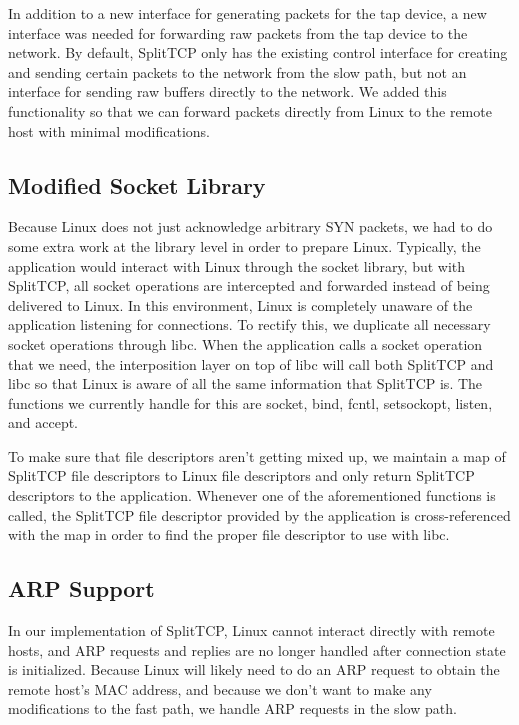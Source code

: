 In addition to a new interface for generating packets for the tap device, a new
interface was needed for forwarding raw packets from the tap device to the 
network. By default, SplitTCP only has the existing control interface for 
creating and sending certain packets to the network from the slow path, but 
not an interface for sending raw buffers directly to the network. We added this
functionality so that we can forward packets directly from Linux to the remote
host with minimal modifications.

\subsection{Modified Socket Library}

Because Linux does not just acknowledge arbitrary SYN packets, we had to do some
extra work at the library level in order to prepare Linux. Typically, the 
application would interact with Linux through the socket library, but with 
SplitTCP, all socket operations are intercepted and forwarded instead of being
delivered to Linux. In this environment, Linux is completely unaware of the 
application listening for connections. To rectify this, we duplicate all 
necessary socket operations through libc. When the application calls a socket 
operation that we need, the interposition layer on top of libc will call both 
SplitTCP and libc so that Linux is aware of all the same information that 
SplitTCP is. The functions we currently handle for this are socket, bind, 
fcntl, setsockopt, listen, and accept. 

To make sure that file descriptors aren't getting mixed up, we maintain a map
of SplitTCP file descriptors to Linux file descriptors and only return SplitTCP
descriptors to the application. Whenever one of the aforementioned functions is 
called, the SplitTCP file descriptor provided by the application is 
cross-referenced with the map in order to find the proper file descriptor to use
with libc. 

\subsection{ARP Support}

In our implementation of SplitTCP, Linux cannot interact directly with remote 
hosts, and ARP requests and replies are no longer handled after connection state
is initialized. Because Linux will likely need to do an ARP request to obtain 
the remote host's MAC address, and because we don't want to make any 
modifications to the fast path, we handle ARP requests in the slow path.

